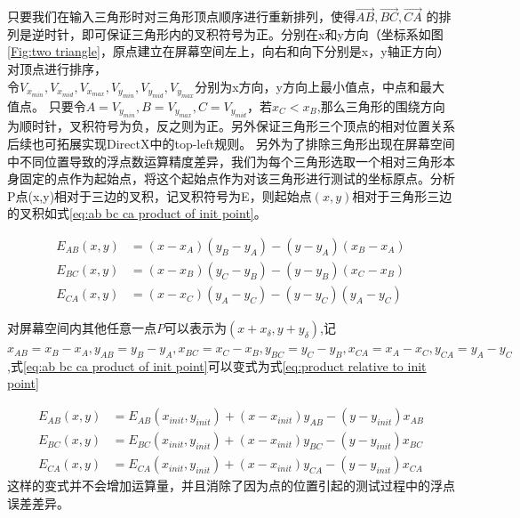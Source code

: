 只要我们在输入三角形时对三角形顶点顺序进行重新排列，使得$\overrightarrow{AB},\overrightarrow{BC},\overrightarrow{CA}$ 的排列是逆时针，即可保证三角形内的叉积符号为正。分别在x和y方向（坐标系如图\ref{Fig:two triangle}，原点建立在屏幕空间左上，向右和向下分别是x，y轴正方向）对顶点进行排序，\\ 令$V_{x_{min}},V_{x_{mid}},V_{x_{max}},V_{y_{min}},V_{y_{mid}},V_{y_{max}}$分别为x方向，y方向上最小值点，中点和最大值点。
只要令$A=V_{y_{min}},B=V_{y_{max}},C=V_{y_{mid}}$，若$x_C<x_B$,那么三角形的围绕方向为顺时针，叉积符号为负，反之则为正。另外保证三角形三个顶点的相对位置关系后续也可拓展实现DirectX中的top-left规则。
另外为了排除三角形出现在屏幕空间中不同位置导致的浮点数运算精度差异，我们为每个三角形选取一个相对三角形本身固定的点作为起始点，将这个起始点作为对该三角形进行测试的坐标原点。分析P点(x,y)相对于三边的叉积，记叉积符号为E，则起始点$(x,y)$相对于三角形三边的叉积如式\ref{eq:ab bc ca product of init point}。

\begin{equation}
    \label{eq:ab bc ca product of init point}
    \begin{split}
        E_{AB} (x,y)&=(x-x_A )(y_B-y_A )-(y-y_A )(x_B-x_A ) \\
        E_{BC} (x,y)&=(x-x_B )(y_C-y_B )-(y-y_B)(x_C-x_B) \\
        E_{CA} (x,y)&=(x-x_C )(y_A-y_C )-(y-y_C)(y_A-y_C)
    \end{split}
\end{equation}

对屏幕空间内其他任意一点$P$可以表示为$(x+x_{\delta},y+y_{\delta})$,记$x_{AB} = x_B-x_A,y_{AB} = y_B-y_A,x_{BC} = x_C-x_B,y_{BC} = y_C-y_B,x_{CA} = x_A-x_C,y_{CA} = y_A-y_C$,式\ref{eq:ab bc ca product of init point}可以变式为式\ref{eq:product relative to init point}

\begin{equation}
    \label{eq:product relative to init point}
    \begin{split}
        E_{AB} (x,y)&=E_{AB} (x_{init},y_{init} )+(x-x_{init} ) y_{AB}-(y-y_{init} ) x_{AB} \\
        E_{BC} (x,y)&=E_{BC} (x_{init},y_{init} )+(x-x_{init} ) y_{BC}-(y-y_{init} ) x_{BC} \\
        E_{CA} (x,y)&=E_{CA} (x_{init},y_{init} )+(x-x_{init} ) y_{CA}-(y-y_{init} ) x_{CA}
    \end{split}
\end{equation}
这样的变式并不会增加运算量，并且消除了因为点的位置引起的测试过程中的浮点误差差异。

